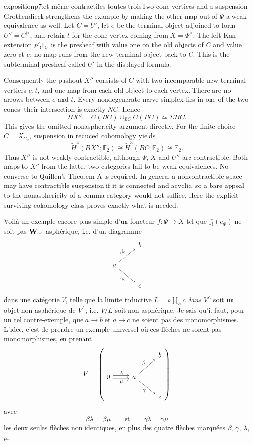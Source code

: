 \begin{dcomment}{exposition}{p7:et même contractiles toutes trois}{Two cone vertices and a suspension}
Grothendieck strengthens the example by making the other map out of $\Psi$ a weak equivalence as well. Let $C=U'$, let $e$ be the terminal object adjoined to form $U''=C^{\triangleright}$, and retain $t$ for the cone vertex coming from $X=\Psi^{\triangleright}$. The left Kan extension $p'_!1_C$ is the presheaf with value one on the old objects of $C$ and value zero at $e$: no map runs from the new terminal object back to $C$. This is the subterminal presheaf called $U'$ in the displayed formula.

Consequently the pushout $X''$ consists of $C$ with two incomparable new terminal vertices $e,t$, and one map from each old object to each vertex. There are no arrows between $e$ and $t$. Every nondegenerate nerve simplex lies in one of the two cones; their intersection is exactly $NC$. Hence
\[
 BX''=C(BC)\cup_{BC}C(BC)\simeq\Sigma BC.
\]
This gives the omitted nonasphericity argument directly. For the finite choice $C=X_{C_2}$, suspension in reduced cohomology yields
\[
 \widetilde H^4(BX'';\mathbb F_2)
   \cong\widetilde H^3(BC;\mathbb F_2)
   \cong\mathbb F_2.
\]
Thus $X''$ is not weakly contractible, although $\Psi$, $X$ and $U''$ are contractible. Both maps to $X''$ from the latter two categories fail to be weak equivalences. No converse to Quillen's Theorem A is required. In general a noncontractible space may have contractible suspension if it is connected and acyclic, so a bare appeal to the nonasphericity of a comma category would not suffice. Here the explicit surviving cohomology class proves exactly what is needed.
\end{dcomment}


Voilà un exemple encore plus simple d'un foncteur $f : \Psi \longrightarrow X$ tel que $f_!(e_{\Psi})$ ne soit pas $\mathbf{W}_{\infty}$-asphérique, i.e. d'un diagramme
\[
\begin{tikzcd}
& b \\
a \arrow[ur, "\beta_0"] \arrow[dr, "\gamma_0"'] & \\
& c
\end{tikzcd}
\]
dans une catégorie $V$, telle que la limite inductive $L = b \amalg_a c$ \textit{dans} $V^{\wedge}$ soit un objet non asphérique de $V^{\wedge}$, i.e. $V/L$ soit non asphérique. Je sais qu'il faut, pour un tel contre-exemple, que $a \longrightarrow b$ et $a \longrightarrow c$ ne soient pas des monomorphismes. L'idée, c'est de prendre un exemple universel où ces flèches ne soient pas monomorphismes, en prenant
\[
V = \left(
\begin{tikzcd}
& & b \\
0 \arrow[r, shift left, "\lambda"] \arrow[r, shift right, "\mu"'] & a \arrow[ur, "\beta"] \arrow[dr, "\gamma"'] & \\
& & c
\end{tikzcd}
\right)
\]
avec
\[ \beta\lambda = \beta\mu \qquad \text{et} \qquad \gamma\lambda = \gamma\mu \]
les deux seules flèches non identiques, en plus des quatre flèches marquées $\beta$, $\gamma$, $\lambda$, $\mu$.

